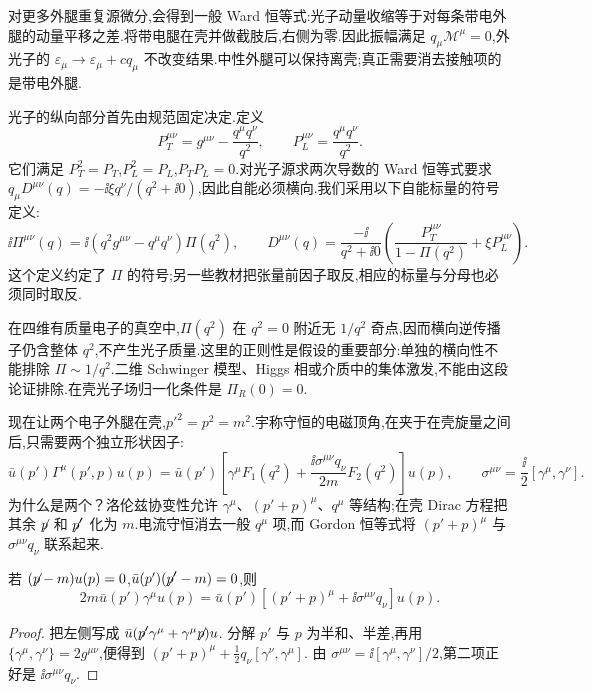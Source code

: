 对更多外腿重复源微分,会得到一般 Ward 恒等式:光子动量收缩等于对每条带电外腿的动量平移之差.将带电腿在壳并做截肢后,右侧为零.因此振幅满足 $q_\mu\mathcal M^\mu=0$,外光子的 $\varepsilon_\mu\to\varepsilon_\mu+cq_\mu$ 不改变结果.中性外腿可以保持离壳;真正需要消去接触项的是带电外腿.


光子的纵向部分首先由规范固定决定.定义
\begin{equation}
 P_T^{\mu\nu}=g^{\mu\nu}-\frac{q^\mu q^\nu}{q^2},\qquad
 P_L^{\mu\nu}=\frac{q^\mu q^\nu}{q^2}.
\end{equation}
它们满足 $P_T^2=P_T$,$P_L^2=P_L$,$P_TP_L=0$.对光子源求两次导数的 Ward 恒等式要求
$q_\mu D^{\mu\nu}(q)=-\ii\xi q^\nu/(q^2+\ii0)$,因此自能必须横向.我们采用以下自能标量的符号定义:
\begin{equation}
 \ii\Pi^{\mu\nu}(q)=\ii(q^2g^{\mu\nu}-q^\mu q^\nu)\Pi(q^2),\qquad
 D^{\mu\nu}(q)=\frac{-\ii}{q^2+\ii0}
  \left(\frac{P_T^{\mu\nu}}{1-\Pi(q^2)}+\xi P_L^{\mu\nu}\right).
 \label{eq:qed-photon-dyson-sign}
\end{equation}
这个定义约定了 $\Pi$ 的符号;另一些教材把张量前因子取反,相应的标量与分母也必须同时取反.

在四维有质量电子的真空中,$\Pi(q^2)$ 在 $q^2=0$ 附近无 $1/q^2$ 奇点,因而横向逆传播子仍含整体 $q^2$,不产生光子质量.这里的正则性是假设的重要部分:单独的横向性不能排除 $\Pi\sim1/q^2$.二维 Schwinger 模型、Higgs 相或介质中的集体激发,不能由这段论证排除.在壳光子场归一化条件是 $\Pi_R(0)=0$.


现在让两个电子外腿在壳,$p'^2=p^2=m^2$.宇称守恒的电磁顶角,在夹于在壳旋量之间后,只需要两个独立形状因子:
\begin{equation}
 \bar u(p')\Gamma^\mu(p',p)u(p)
 =\bar u(p')\left[\gamma^\mu F_1(q^2)
       +\frac{\ii\sigma^{\mu\nu}q_\nu}{2m}F_2(q^2)\right]u(p),
 \qquad \sigma^{\mu\nu}=\frac{\ii}{2}[\gamma^\mu,\gamma^\nu].
 \label{eq:qed-form-factors}
\end{equation}
为什么是两个？洛伦兹协变性允许 $\gamma^\mu$、$(p'+p)^\mu$、$q^\mu$ 等结构;在壳 Dirac 方程把其余 $\slashed p$ 和 $\slashed p'$ 化为 $m$.电流守恒消去一般 $q^\mu$ 项,而 Gordon 恒等式将 $(p'+p)^\mu$ 与 $\sigma^{\mu\nu}q_\nu$ 联系起来.

\begin{proposition}
若 $(\slashed p-m)u(p)=0$,$\bar u(p')(\slashed p'-m)=0$,则
\begin{equation}
 2m\bar u(p')\gamma^\mu u(p)
 =\bar u(p')\left[(p'+p)^\mu+\ii\sigma^{\mu\nu}q_\nu\right]u(p).
\end{equation}
\end{proposition}
\begin{proof}
把左侧写成 $\bar u(\slashed p'\gamma^\mu+\gamma^\mu\slashed p)u$.
分解 $p'$ 与 $p$ 为半和、半差,再用
$\{\gamma^\mu,\gamma^\nu\}=2g^{\mu\nu}$,便得到
$(p'+p)^\mu+\tfrac12q_\nu[\gamma^\nu,\gamma^\mu]$.
由 $\sigma^{\mu\nu}=\ii[\gamma^\mu,\gamma^\nu]/2$,第二项正好是 $\ii\sigma^{\mu\nu}q_\nu$.
\end{proof}

